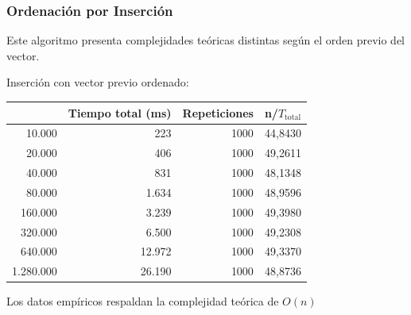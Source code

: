 \documentclass[12pt,a4paper]{article}
\renewcommand{\thesubsubsection}{\arabic{subsubsection}.}
\newcommand{\result}[1]{%
  \subsubsection{#1}%
  \label{result:\thesubsubsection}
}
\begin{document}
\vspace{6mm}
\result{Ordenación por Inserción}
Este algoritmo presenta complejidades teóricas distintas según el orden previo del vector.

\vspace{2mm}
Inserción con vector previo ordenado:
\begin{table}[H]
\centering
\renewcommand{\arraystretch}{1.2}
\begin{tabular}{|r|r|r|r|}
\hline
\rowcolor{LightSteelBlue2}
\multicolumn{1}{|c|}{n} & \multicolumn{1}{c|}{Tiempo total (ms)} & \multicolumn{1}{c|}{Repeticiones} & \multicolumn{1}{c|}{n/$T_\text{total}$} \\ \hline
10.000                   & 223                                    & 1000                              & 44,8430                  \\ \hline
20.000                   & 406                                    & 1000                              & 49,2611                  \\ \hline
40.000                   & 831                                    & 1000                              & 48,1348                  \\ \hline
80.000                   & 1.634                                   & 1000                              & 48,9596                  \\ \hline
160.000                  & 3.239                                   & 1000                              & 49,3980                  \\ \hline
320.000                  & 6.500                                   & 1000                              & 49,2308                  \\ \hline
640.000                  & 12.972                                  & 1000                              & 49,3370                  \\ \hline
1.280.000                 & 26.190                                  & 1000                              & 48,8736                  \\ \hline
\end{tabular}
\end{table}
Los datos empíricos respaldan la complejidad teórica de $O(n)$
\end{document}
